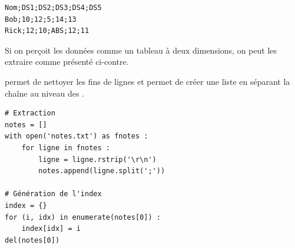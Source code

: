\begin{multicols}{2}

\vspace{-2ex}
\begin{verbatim}
Nom;DS1;DS2;DS3;DS4;DS5
Bob;10;12;5;14;13 
Rick;12;10;ABS;12;11
\end{verbatim}

Si on perçoit les données comme un tableau à deux dimensions, on peut les extraire comme présenté ci-contre.

 permet de nettoyer les fins de lignes et  permet de créer une liste en séparant la chaîne au niveau des .

\begin{verbatim}
# Extraction
notes = []
with open('notes.txt') as fnotes :
    for ligne in fnotes :
        ligne = ligne.rstrip('\r\n')
        notes.append(ligne.split(';'))

# Génération de l'index
index = {}
for (i, idx) in enumerate(notes[0]) :
    index[idx] = i
del(notes[0])
\end{verbatim}

\end{multicols}

